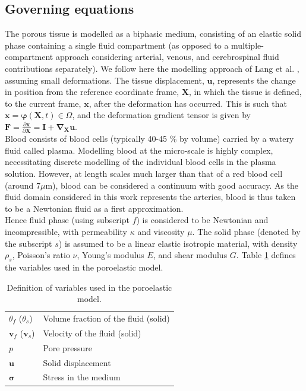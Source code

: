 \documentclass[oneside,11pt,times]{book}
\begin{document}
\subsection{Governing equations} \label{sec:governing}
The porous tissue is modelled as a biphasic medium, consisting of an elastic solid phase containing a single fluid compartment (as opposed to a multiple-compartment approach considering arterial, venous, and cerebrospinal fluid contributions separately). We follow here the modelling approach of Lang et al. \cite{goriely2016mathematical}, assuming small deformations. The tissue displacement, $\bm{u}$, represents the change in position from the reference coordinate frame, $\bm{X}$, in which the tissue is defined, to the current frame, $\bm{x}$, after the deformation has occurred. This is such that $\bm{x} = \bm{\varphi}(\bm{X},t) \in \Omega$, and the deformation gradient tensor is given by $\bm{F} = \frac{\partial \bm{x}}{\partial \bm{X}} = \bm{I} + \bm{\nabla_X u}$.\\


Blood consists of blood cells (typically 40-45 \% by volume) carried by a watery fluid called plasma. Modelling blood at the micro-scale is highly complex, necessitating discrete modelling of the individual blood cells in the plasma solution. However, at length scales much larger than that of a red blood cell (around 7$\mu$m), blood can be considered a continuum with good accuracy. As the fluid domain considered in this work represents the arteries, blood is thus taken to be a Newtonian fluid as a first approximation. \\


Hence fluid phase (using subscript $f$) is considered to be Newtonian and incompressible, with permeability $\kappa$ and viscosity $\mu$. The solid phase (denoted by the subscript $s$) is assumed to be a linear elastic isotropic material, with density  $\rho_{s}$, Poisson's ratio $\nu$, Young's modulus $E$, and shear modulus $G$. Table \ref{tab:variables} defines the variables used in the poroelastic model.\\

\begin{table}[htbp]
\caption{Definition of variables used in the poroelastic model.}
\centering
\begin{tabular}{ p{2cm} p{6cm} }
 \toprule
    $\theta_f$ ($\theta_s$)& Volume fraction of the fluid (solid) \\
    
    $\bm{v}_f$ ($\bm{v}_s$)& Velocity of the fluid (solid) \\
    
    $p$ & Pore pressure \\
    
    $\bm{u}$ & Solid displacement \\
    
    $\bm{\sigma}$ & Stress in the medium \\
    \bottomrule
\end{tabular}
\label{tab:variables}
\end{table}
\end{document}
